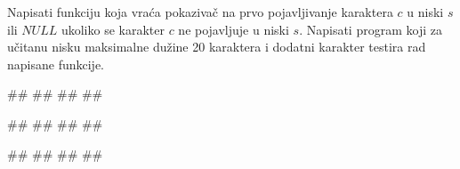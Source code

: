 

\begin{Exercise}[label=p2.3_09] 
Napisati funkciju  koja vraća pokazivač na prvo pojavljivanje karaktera $c$ u niski $s$ ili $NULL$ ukoliko se karakter $c$ ne pojavljuje u niski $s$. Napisati program koji za učitanu nisku maksimalne dužine 20 karaktera i dodatni karakter testira rad napisane funkcije. 
 
\begin{miditest}
\begin{upotreba}{1}
#\naslovInt#
##
##
##
\end{upotreba}
\end{miditest}
\begin{minitest}
\begin{upotreba}{2}
#\naslovInt#
##
##
##
\end{upotreba}
\end{minitest}

\begin{minitest}
\begin{upotreba}{3}
#\naslovInt#
##
##
##
\end{upotreba}
\end{minitest}
\end{Exercise}
\ifresenja
\begin{Answer}[ref=p2.3_09]
\end{Answer}
\fi

